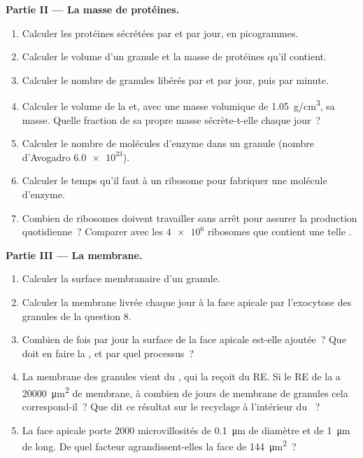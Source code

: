 \begin{problem}
\medskip
\noindent\textbf{Partie II --- La masse de protéines.}
\begin{enumerate}[resume]
  \item Calculer les protéines sécrétées par  et par jour, en
        picogrammes.
  \item Calculer le volume d'un granule et la masse de protéines qu'il
        contient.
  \item Calculer le nombre de granules libérés par  et par jour,
        puis par minute.
  \item Calculer le volume de la  et, avec une masse volumique de
        \qty{1.05}{g/cm^3}, sa masse. Quelle fraction de sa propre masse
        sécrète-t-elle chaque jour~?
  \item Calculer le nombre de molécules d'enzyme dans un granule
        (nombre d'Avogadro $\num{6.0e23}$).
  \item Calculer le temps qu'il faut à un ribosome pour fabriquer une
        molécule d'enzyme.
  \item Combien de ribosomes doivent travailler sans arrêt pour assurer
        la production quotidienne~? Comparer avec les $\num{4e6}$
        ribosomes que contient une telle .
\end{enumerate}

\medskip
\noindent\textbf{Partie III --- La membrane.}
\begin{enumerate}[resume]
  \item Calculer la surface membranaire d'un granule.
  \item Calculer la membrane livrée chaque jour à la face apicale par
        l'exocytose des granules de la question 8.
  \item Combien de fois par jour la surface de la face apicale est-elle
        ajoutée~? Que doit en faire la , et par quel processus~?
  \item La membrane des granules vient du , qui la reçoit du RE. Si
        le RE de la  a \qty{20000}{\micro m^2} de membrane, à
        combien de jours de membrane de granules cela correspond-il~?
        Que dit ce résultat sur le recyclage à l'intérieur du ~?
  \item La face apicale porte \qty{2000}{} microvillosités de
        \qty{0.1}{\micro m} de diamètre et de \qty{1}{\micro m} de long.
        De quel facteur agrandissent-elles la face de
        \qty{144}{\micro m^2}~?
\end{enumerate}


\end{problem}
